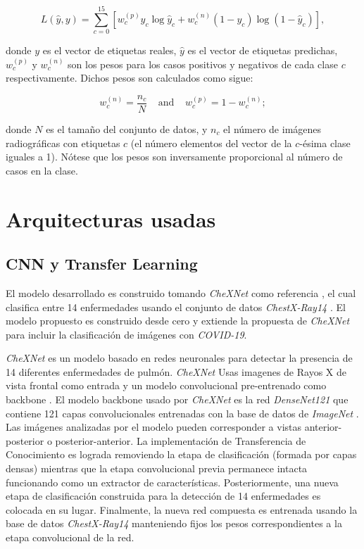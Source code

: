 {\begin{equation} \label{eq:loss}
    L(\hat y, y) = \sum_{c=0}^{15} \left[ w_c^{(p)} y_c \log \hat y_c + w_c^{(n)} (1-y_c) \log (1- \hat y_c) \right],
\end{equation}

donde $y$ es el vector de etiquetas reales, $\hat y$ es el vector de etiquetas predichas,
$w_c^{(p)}$ y $w_c^{(n)}$ son los pesos para los casos positivos y negativos de cada clase $c$
respectivamente. Dichos pesos son calculados como sigue:

\begin{equation}\label{eq:weights}
    w_c^{(n)} = \frac{n_c}{N} \;\;\;\; \text{and} \;\;\;\; w_c^{(p)} = 1-  w_c^{(n)};
\end{equation}

donde $N$ es el tamaño del conjunto de datos, y $n_c$ el número de imágenes radiográficas con
etiquetas $c$ (el número elementos del vector de la $c$-ésima clase iguales a 1). Nótese que los
pesos son inversamente proporcional al número de casos en la clase.


\section{Arquitecturas usadas}

\subsection{CNN y Transfer Learning}

El modelo desarrollado es construido tomando \textit{CheXNet} como referencia
\cite{rajpurkar2018deep}, el cual clasifica entre 14 enfermedades
usando el conjunto de datos \textit{ChestX-Ray14} \cite{wang2017chestx}. El modelo propuesto es
construido desde cero y extiende la propuesta de \textit{CheXNet} para incluir la clasificación de
imágenes con \textit{COVID-19}.

\textit{CheXNet} es un modelo basado en redes neuronales para detectar la presencia de 14 diferentes
enfermedades de pulmón. \textit{CheXNet} Usas imagenes de Rayos X de vista frontal como entrada y
un modelo convolucional pre-entrenado como backbone \cite{rajpurkar2018deep}. El modelo backbone usado
por \textit{CheXNet} es la red \textit{DenseNet121} \cite{huang2017densely} que contiene 121 capas
convolucionales entrenadas con la base de datos de \textit{ImageNet} \cite{ILSVRC15}. Las imágenes
analizadas por el modelo pueden corresponder a vistas anterior-posterior o posterior-anterior. La
implementación de Transferencia de Conocimiento es lograda removiendo la etapa de clasificación
(formada por capas densas) mientras que la etapa convolucional previa permanece intacta funcionando
como un extractor de características. Posteriormente, una nueva etapa de clasificación construida
para la detección de 14 enfermedades es colocada en su lugar. Finalmente, la nueva red compuesta
es entrenada usando la base de datos \textit{ChestX-Ray14} manteniendo fijos los pesos
correspondientes a la etapa convolucional de la red.

}
